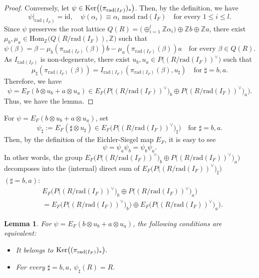\documentclass[11pt]{amsart}
\newtheorem{lemma}[thm]{Lemma}%
\begin{document}
{\begin{proof}
Conversely, let $\psi\in \mbox{\rm Ker}\bigl((\pi_{\mathrm{rad}(I_F)})_*\bigr)$. Then, 
by the definition, we have
$$\psi|_{\mathrm{rad}(I_F)}=\mbox{id},\quad \psi(\alpha_i)\equiv 
\alpha_i \mbox{ mod rad}(I_F)\quad \mbox{for every }1\leq i\leq l.$$
Since $\psi$ preserves the root lattice 
$Q(R)=\bigl(\oplus_{i=1}^l\mathbb{Z}\alpha_i\bigr)\oplus\mathbb{Z}b
\oplus\mathbb{Z}a$, there exist $\mu_b,\mu_a\in 
\mbox{Hom}_{\mathbb{Z}}\big(Q(R/\mathrm{rad}(I_F)),\mathbb{Z}\big)$ such that 
\[\psi(\beta)=\beta-\mu_b(\pi_{\mathrm{rad}(I_F)}(\beta))b
-\mu_a(\pi_{\mathrm{rad}(I_F)}(\beta))a\quad\mbox{for every }
\beta\in Q(R).\]
As $I_{\mathrm{rad}(I_F)}$ is non-degenerate, there exist 
$u_b,u_a\in P\big((R/\mathrm{rad}(I_F))^\vee\big)$ such that
\[\mu_{\sharp}(\pi_{\mathrm{rad}(I_F)}(\beta))
=I_{\mathrm{rad}(I_F)}(\pi_{\mathrm{rad}(I_F)}(\beta),u_\sharp)\quad 
\mbox{for }\sharp=b,a.\]
Therefore, we have
\[\psi=E_{F}(b\otimes u_b+a\otimes u_a)\in
E_F\big(P\big((R/\mathrm{rad}(I_F))^\vee\big)_b\oplus 
P\big((R/\mathrm{rad}(I_F))^\vee\big)_a\big).\]
Thus, we have the lemma.
\end{proof}
For $\psi=E_F(b\otimes u_b+a\otimes u_a)$, set 
\begin{equation*}\label{eqn:psi_sharp}
\psi_{\sharp}:=E_F({\sharp}\otimes u_{\sharp})
\in E_F\bigr(P\big((R/\mathrm{rad}(I_F))^\vee\big)_{\sharp}\bigr)\quad
\mbox{for }\sharp=b,a.
\end{equation*}
Then, by the definition of the Eichler-Siegel map $E_F$, it is easy to see 
\begin{equation}\label{eqn:comm-psi}
\psi=\psi_a\psi_b=\psi_b\psi_a.
\end{equation}
In other words, the group $E_F\bigl(P\big((R/\mathrm{rad}(I_F))^\vee\big)_b\oplus 
P\big((R/\mathrm{rad}(I_F))^\vee\big)_a\bigr)$
decomposes into the (internal) direct sum of 
$E_F\bigl(P\big((R/\mathrm{rad}(I_F))^\vee\big)_\sharp\bigr)$ $(\sharp=b,a)$:
\begin{equation}
\begin{aligned}
&E_F\bigl(P\big((R/\mathrm{rad}(I_F))^\vee\big)_b\oplus 
P\big((R/\mathrm{rad}(I_F))^\vee\big)_a\bigr)\\
&=E_F\bigl(P\big((R/\mathrm{rad}(I_F))^\vee\big)_b\bigr)\oplus 
E_F\bigl(P\big((R/\mathrm{rad}(I_F))^\vee\big)_a\bigr).
\end{aligned}
\end{equation}

\begin{lemma}\label{lemma:ker2}
For $\psi=E_F(b\otimes u_b+a\otimes u_a)$, the following conditions are 
equivalent{\rm :}
\begin{itemize}
\item[(a)] It belongs to $\mbox{\rm Ker}\bigl((\pi_{\mathrm{rad}(I_F)})_*\bigr).$
\vskip 1mm
\item[(b)] For every $\sharp=b,a$, $\psi_\sharp(R)=R.$
\end{itemize}
\end{lemma}

}
\end{document}

